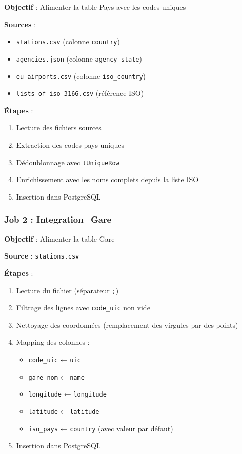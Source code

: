 \documentclass[12pt,a4paper]{article}
\begin{document}
\textbf{Objectif} : Alimenter la table Pays avec les codes uniques

\textbf{Sources} :
\begin{itemize}
    \item \texttt{stations.csv} (colonne \texttt{country})
    \item \texttt{agencies.json} (colonne \texttt{agency\_state})
    \item \texttt{eu-airports.csv} (colonne \texttt{iso\_country})
    \item \texttt{lists\_of\_iso\_3166.csv} (référence ISO)
\end{itemize}

\textbf{Étapes} :
\begin{enumerate}
    \item Lecture des fichiers sources
    \item Extraction des codes pays uniques
    \item Dédoublonnage avec \texttt{tUniqueRow}
    \item Enrichissement avec les noms complets depuis la liste ISO
    \item Insertion dans PostgreSQL
\end{enumerate}

\subsubsection{Job 2 : Integration\_Gare}

\textbf{Objectif} : Alimenter la table Gare

\textbf{Source} : \texttt{stations.csv}

\textbf{Étapes} :
\begin{enumerate}
    \item Lecture du fichier (séparateur \texttt{;})
    \item Filtrage des lignes avec \texttt{code\_uic} non vide
    \item Nettoyage des coordonnées (remplacement des virgules par des points)
    \item Mapping des colonnes :
        \begin{itemize}
            \item \texttt{code\_uic} ← \texttt{uic}
            \item \texttt{gare\_nom} ← \texttt{name}
            \item \texttt{longitude} ← \texttt{longitude}
            \item \texttt{latitude} ← \texttt{latitude}
            \item \texttt{iso\_pays} ← \texttt{country} (avec valeur par défaut)
        \end{itemize}
    \item Insertion dans PostgreSQL
\end{enumerate}
\end{document}
